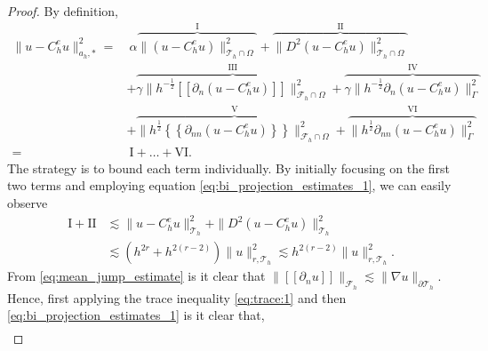 \documentclass[11pt]{article}
\theoremstyle{remark}
\newcommand{\mean}[1]{\left\{\!\!\left\{#1\right\}\!\!\right\}}
\newcommand{\jump}[1]{\left[\!\left[ #1 \right]\!\right]}
\numberwithin{equation}{section}
\begin{document}
\begin{proof}
    By definition,
    \begin{equation}
        \begin{split}
            \| u - C_{h}^{e}u \|_{ a_{h}, * }^{  2}  =& \ \alpha  \overbrace{\|  ( u - C_{h}^{e}u) \|_{ \mathcal{T} _{h} \cap \Omega  }^{ 2}}^{\mathrm{I} }   + \overbrace{\| D^2 ( u - C_{h}^{e}u ) \|_{\mathcal{T} _{h} \cap \Omega   }^{ 2
            }}^{\mathrm{II} }  \\  &  +
            \overbrace{\gamma \| h^{-\frac{1}{2}} \jump{ \partial _{n} (u -
        C_{h}^{e} u) }   \|_{ \mathcal{F}_{h}^{}\cap \Omega    }^{ 2
        }}^{\mathrm{III} }  + \overbrace{\gamma \| h^{-\frac{1}{2}}  \partial _{n} (u - C_{h}^{e}u)    \|_{ \Gamma   }^{ 2 }}^{\mathrm{IV} }  \\
          & + \overbrace{\| h^{\frac{1}{2}} \mean{ \partial _{nn} (u - C_{h}^{e}u) }   \|_{\mathcal{F} _{h}^{} \cap \Omega   }^{  2}}^{\mathrm{V} }  +  \overbrace{\| h^{\frac{1}{2}} \partial _{nn}(u - C_{h}^{e}u)     \|_{ \Gamma }^{  2}}^{\mathrm{VI}
          } \\
          =& \  \mathrm{I}  + \ldots + \mathrm{VI}.
        \end{split}
    \end{equation}
    The strategy is to bound each term individually.
    By initially focusing on the first two terms and employing equation \eqref{eq:bi_projection_estimates_1}, we can easily observe
             \begin{equation}
        \begin{split}
            \mathrm{I} +\mathrm{II}  & \lesssim \|   u - C_{h}^{e}u \|_{ \mathcal{T} _{h}  }^{ 2} + \|  D^2( u - C_{h}^{e}u )  \|_{\mathcal{T} _{h} }^{ 2 } \\
                                     & \lesssim  ( h^{2r}  + h^{2(r-2)} )\| u \|_{r,\mathcal{T}_{h} }^{  2} \lesssim h^{2(r -2)} \| u
                                     \|_{r, \mathcal{T} _{h} }^{2  }  .
        \end{split}
             \end{equation}
    From \eqref{eq:mean_jump_estimate} is it clear that $\| \jump{ \partial _{n} u }   \|_{ \mathcal{F}_{h}   }^{  } \lesssim \| \nabla  u \|_{ \partial  \mathcal{T} _{h} }^{  }   $. Hence, first applying the trace inequality \eqref{eq:trace:1}  and then
    \eqref{eq:bi_projection_estimates_1} is it clear that,
    \begin{equation}
        \begin{split}

\end{split}
\end{equation}
\end{proof}
\end{document}
